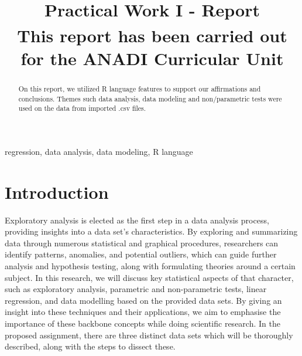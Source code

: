 \documentclass[conference]{IEEEtran}
\begin{document}
\title{Practical Work I - Report\\
{\footnotesize \textsuperscript{}This report has been carried out for the ANADI Curricular Unit}
}

\author{
\and

\and

}

\maketitle

\begin{abstract}
On this report, we utilized R language features to support our affirmations and conclusions.
Themes such data analysis, data modeling and non/parametric tests were used on the data from imported .csv files. 
\end{abstract}

\begin{IEEEkeywords}
regression, data analysis, data modeling, R language
\end{IEEEkeywords}

\section{Introduction}

Exploratory analysis is elected as the first step in a data analysis process, providing insights into a data set's characteristics. By exploring and summarizing data through numerous statistical and graphical procedures, 
researchers can identify patterns, anomalies, and potential outliers, which can guide further analysis and hypothesis testing, along with formulating theories around a certain subject.
In this research, we will discuss key statistical aspects of that character, such as exploratory analysis, parametric and non-parametric tests, linear regression, and data modelling based on the provided data sets.
By giving an insight into these techniques and their applications, we aim to emphasise the importance of these backbone concepts while doing scientific research.
In the proposed assignment, there are three distinct data sets which will be thoroughly described, along with the steps to dissect these.
\end{document}
